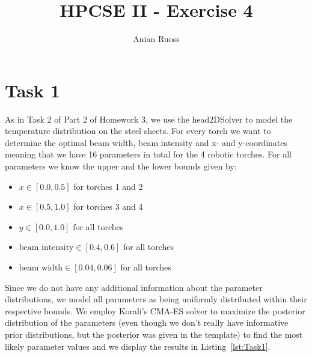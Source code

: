 \documentclass[11pt]{article}
\begin{document}
    \title{HPCSE II - Exercise 4}
    \author{Anian Ruoss}
    \maketitle

    \section*{Task 1}
    \label{sec:Task1}

    As in Task 2 of Part 2 of Homework 3, we use the head2DSolver to model
    the temperature distribution on the steel sheets.
    For every torch we want to determine the optimal beam width, beam
    intensity and x- and y-coordinates meaning that we have 16 parameters in
    total for the 4 robotic torches.
    For all parameters we know the upper and the lower bounds given by:
    \begin{itemize}
        \item $x \in [0.0, 0.5]$ for torches 1 and 2
        \item $x \in [0.5, 1.0]$ for torches 3 and 4
        \item $y \in [0.0, 1.0]$ for all torches
        \item $\text{beam intensity} \in [0.4, 0.6]$ for all torches
        \item $\text{beam width} \in [0.04, 0.06]$ for all torches
    \end{itemize}
    Since we do not have any additional information about the parameter
    distributions, we model all parameters as being uniformly distributed
    within their respective bounds.
    We employ Korali's CMA-ES solver to maximize the posterior
    distribution of the parameters (even though we don't really have
    informative prior distributions, but the posterior was given in the
    template) to find the most likely parameter values and we display the
    results in Listing~\ref{lst:Task1}.
\end{document}
